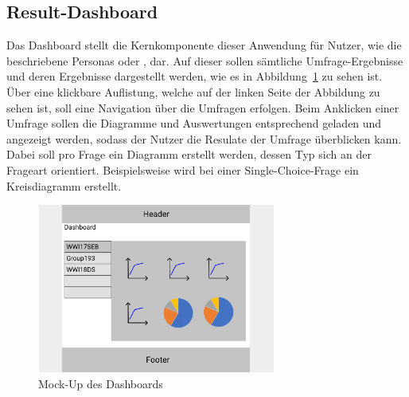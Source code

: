 \subsection{Result-Dashboard}
\label{ssec:konzept:client:dashboard}

Das Dashboard stellt die Kernkomponente dieser Anwendung für Nutzer, wie die beschriebene Personas \dutzi oder \ariane, dar.
Auf dieser sollen sämtliche Umfrage-Ergebnisse und deren Ergebnisse dargestellt werden, wie es in Abbildung~\ref{fig:MockDashboard} zu sehen ist.
Über eine klickbare Auflistung, welche auf der linken Seite der Abbildung zu sehen ist, soll eine Navigation über die Umfragen erfolgen.
Beim Anklicken einer Umfrage sollen die Diagramme und Auswertungen entsprechend geladen und angezeigt werden, sodass der Nutzer die Resulate der Umfrage überblicken kann.
Dabei soll pro Frage ein Diagramm erstellt werden, dessen Typ sich an der Frageart orientiert.
Beispielsweise wird bei einer Single-Choice-Frage ein Kreisdiagramm erstellt.

\begin{figure}[H]
	\centering
	\includegraphics[width=0.7\textwidth]{img/konzeption/client/dashboard}
	\captionsetup{justification=centering, format=plain}
	\caption[Mock-Up des Dashboards]{Mock-Up des Dashboards \\\figma}
	\label{fig:MockDashboard}
\end{figure}

